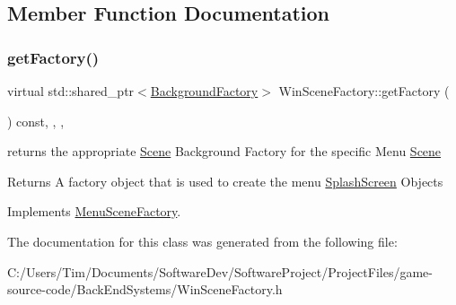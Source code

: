 \subsection{Member Function Documentation}
\mbox{\label{class_win_scene_factory_af2e1c7ae34601b5f4017937d7bd381bb}} 
\subsubsection{\texorpdfstring{get\+Factory()}{getFactory()}}
{\footnotesize\ttfamily virtual std\+::shared\+\_\+ptr$<$\hyperlink{class_background_factory}{Background\+Factory}$>$ Win\+Scene\+Factory\+::get\+Factory (\begin{DoxyParamCaption}{ }\end{DoxyParamCaption}) const\hspace{0.3cm}{\ttfamily [inline]}, {\ttfamily [override]}, {\ttfamily [protected]}, {\ttfamily [virtual]}}



returns the appropriate \hyperlink{class_scene}{Scene} Background Factory for the specific Menu \hyperlink{class_scene}{Scene} 

\begin{DoxyReturn}{Returns}
A factory object that is used to create the menu \hyperlink{class_splash_screen}{Splash\+Screen} Objects 
\end{DoxyReturn}


Implements \hyperlink{class_menu_scene_factory_ad0f60a16fdbb10c6d7ba3311dafa2e76}{Menu\+Scene\+Factory}.



The documentation for this class was generated from the following file\+:\begin{DoxyCompactItemize}
\item 
C\+:/\+Users/\+Tim/\+Documents/\+Software\+Dev/\+Software\+Project/\+Project\+Files/game-\/source-\/code/\+Back\+End\+Systems/Win\+Scene\+Factory.\+h\end{DoxyCompactItemize}
